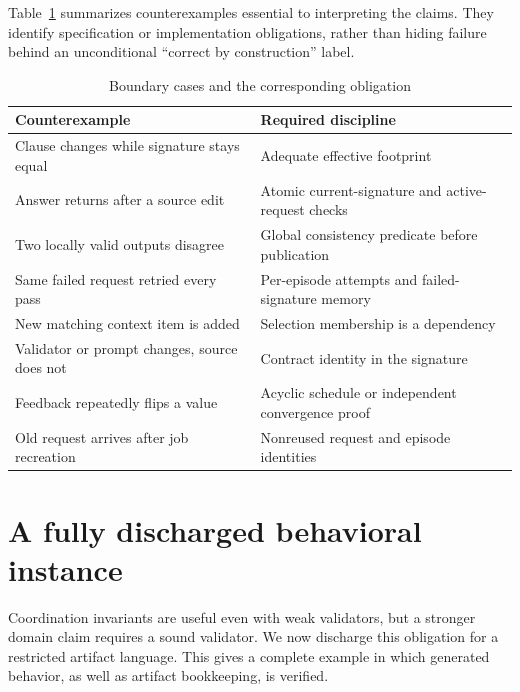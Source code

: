 \documentclass[pdflatex,sn-mathphys-num]{sn-jnl}
\theoremstyle{thmstyleone}
\theoremstyle{thmstylethree}
\theoremstyle{thmstyletwo}
\begin{document}
Table~\ref{tab:boundaries} summarizes counterexamples essential to interpreting the claims. They identify specification or implementation obligations, rather than hiding failure behind an unconditional ``correct by construction'' label.
\begin{table}[tb]
\caption{Boundary cases and the corresponding obligation}\label{tab:boundaries}
\small\begin{tabularx}{\linewidth}{@{}XX@{}}\toprule
Counterexample & Required discipline\\\midrule
Clause changes while signature stays equal & Adequate effective footprint\\
Answer returns after a source edit & Atomic current-signature and active-request checks\\
Two locally valid outputs disagree & Global consistency predicate before publication\\
Same failed request retried every pass & Per-episode attempts and failed-signature memory\\
New matching context item is added & Selection membership is a dependency\\
Validator or prompt changes, source does not & Contract identity in the signature\\
Feedback repeatedly flips a value & Acyclic schedule or independent convergence proof\\
Old request arrives after job recreation & Nonreused request and episode identities\\\bottomrule
\end{tabularx}
\end{table}

\section{A fully discharged behavioral instance}\label{sec:discharged}
Coordination invariants are useful even with weak validators, but a stronger domain claim requires a sound validator. We now discharge this obligation for a restricted artifact language. This gives a complete example in which generated behavior, as well as artifact bookkeeping, is verified.
\end{document}
